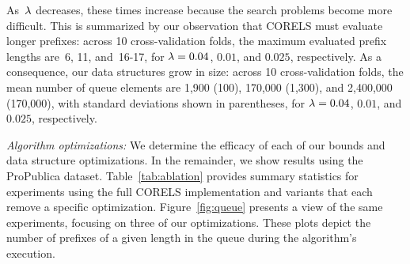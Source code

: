 As~${\lambda}$ decreases, these times increase because the search problems become more difficult.
%
This is summarized by our observation that CORELS must evaluate longer prefixes:
across 10 cross-validation folds, the maximum evaluated prefix lengths are~6,
11, and~16-17, for ${{\lambda} = 0.04}$, $0.01$, and $0.025$, respectively.
%
As a consequence, our data structures grow in size: \eg
across 10 cross-validation folds, the mean number of queue elements are
1,900 (100), 170,000 (1,300), and 2,400,000 (170,000),
with standard deviations shown in parentheses,
for ${{\lambda} = 0.04}$, $0.01$, and $0.025$, respectively.


\textit{Algorithm optimizations:}
We determine the efficacy of each of our bounds and data structure optimizations.
%
In the remainder, we show results using the ProPublica dataset.
%
Table~\ref{tab:ablation} provides summary statistics for experiments using
the full CORELS implementation and variants that each remove a specific optimization.
%
Figure~\ref{fig:queue} presents a view of the same experiments, focusing
on three of our optimizations. These plots depict the number of
prefixes of a given length in the queue during the algorithm's execution.

\begin{table}[t!]
\centering
{}
\vspace{4mm}
\caption{Per-component performance improvement (ProPublica).
%
Columns report total execution time,
time to optimum, number of queue insertions,
maximum queue size, and maximum evaluated prefix length.
%
The first row shows CORELS; subsequent rows show variants
that each remove one implementation optimization or bound.
%
We terminated each experiment in the last row once the size of the
trie reached ${10^9}$ nodes (each execution consumed $\sim$350GB RAM).
%
In all but the final row and column, we report means
(and standard deviations) over 10 cross-validation folds;
in the final row, we report the minimum values across folds.
}
\label{tab:ablation}
\end{table}

